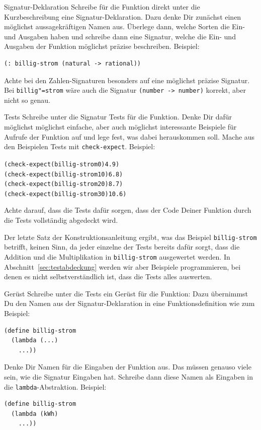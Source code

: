 \begin{konstruktionsanleitung}{Signatur-Deklaration}
  \label{ka:signatur-deklaration}
  Schreibe für die Funktion direkt unter die Kurzbeschreibung eine
  Signatur-Deklaration.  Dazu denke Dir zunächst einen möglichst
  aussagekräftigen Namen aus.  Überlege dann, welche Sorten die Ein-
  und Ausgaben haben und schreibe dann eine Signatur, welche die Ein-
  und Ausgaben der Funktion möglichst präzise beschreiben.  Beispiel:
  \begin{verbatim}
(: billig-strom (natural -> rational))
\end{verbatim}
  Achte bei den Zahlen-Signaturen besonders auf eine möglichst präzise
  Signatur.  Bei \texttt{billig"=strom} wäre auch die Signatur
  \texttt{(number -> number)} korrekt, aber nicht so genau.
\end{konstruktionsanleitung}

\begin{konstruktionsanleitung}{Tests}
  \label{ka:tests}
  Schreibe unter die Signatur Tests für die Funktion.  Denke Dir dafür
  möglichst möglichst einfache, aber auch möglichst interessante
  Beispiele für Aufrufe der Funktion auf und lege fest, was dabei
  herauskommen soll.  Mache aus den Beispielen Tests mit
  \texttt{check-expect}.  Beispiel:
\begin{alltt}
(check-expect (billig-strom 0) 4.9)
(check-expect (billig-strom 10) 6.8)
(check-expect (billig-strom 20) 8.7)
(check-expect (billig-strom 30) 10.6)
\end{alltt}
  Achte darauf, dass die Tests dafür sorgen, dass der Code Deiner
  Funktion durch die Tests vollständig abgedeckt wird.
\end{konstruktionsanleitung}
%
Der letzte Satz der Konstruktionsanleitung ergibt, was das Beispiel
\texttt{billig-strom} betrifft, keinen Sinn, da jeder einzelne der
Tests bereits dafür
sorgt, dass die Addition und die Multiplikation in
\texttt{billig-strom} ausgewertet werden.  In
Abschnitt~\ref{sec:testabdeckung} werden wir aber Beispiele
programmieren, bei denen es nicht selbstverständlich ist, dass die
Tests alles auswerten.

\begin{konstruktionsanleitung}{Gerüst}
  \label{ka:geruest}
  Schreibe unter die Tests ein Gerüst für die Funktion: Dazu
  übernimmst Du den Namen aus der Signatur-Deklaration in eine
  Funktionsdefinition wie zum Beispiel:
\begin{verbatim}
(define billig-strom
  (lambda (...)
    ...))
\end{verbatim}
  Denke Dir Namen für die Eingaben der Funktion aus.  Das müssen
  genauso viele sein, wie die Signatur Eingaben hat.  Schreibe dann
  diese Namen als Eingaben in die \texttt{lambda}-Abstraktion.
  Beispiel:
  \begin{verbatim}
(define billig-strom
  (lambda (kWh)
    ...))
\end{verbatim}
\end{konstruktionsanleitung}

